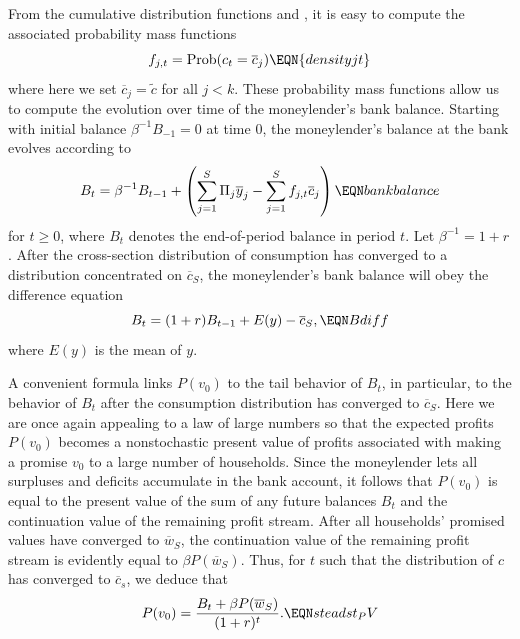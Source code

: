   From the cumulative distribution functions  and
, it is easy to compute the associated probability mass functions
$$ f_{j,t} = {\rm Prob} (c_t = \overline c_j)   \EQN{densityjt} $$
where here we set $\overline c_j = \tilde c$ for all $j < k$.
These probability mass functions allow us to compute the evolution over time
of the moneylender's bank balance.  Starting with initial
balance $\beta^{-1} B_{-1} =0$ at time $0$, the moneylender's balance at
the bank evolves according to
$$ B_{t} = \beta^{-1} B_{t-1}
  + \left(\sum_{j=1}^S \Pi_j \overline y_j - \sum_{j=1}^S
  f_{j,t}  \overline c_j\right) \EQN bankbalance $$
for $t \geq 0$, where $B_t$ denotes the end-of-period balance
in period $t$.  Let $\beta^{-1} = 1+r$.
 After the cross-section distribution
of consumption has converged to a distribution
concentrated on $\overline c_S$, the moneylender's bank
balance will obey the difference equation
$$ B_t = (1+r) B_{t-1} + E(y) - \overline c_S , \EQN Bdiff  $$
where $E(y)$ is the mean of $y$.

A convenient formula links $P(v_0)$ to the tail behavior of $B_t$,
in particular, to the behavior of $B_t$  after the consumption
distribution has converged to $\overline c_S$. Here we are once
again appealing to a law of large numbers so that the expected
profits $P(v_0)$ becomes a nonstochastic present value of profits
associated with making a promise $v_0$ to a large number of
households. Since the moneylender lets all surpluses and deficits
 accumulate in the bank account, it follows that $P(v_0)$
is equal to the present value of the sum of any future balances
$B_t$ and the continuation value of the remaining profit stream.
After
all households' promised values have converged to $\overline
w_S$, the continuation value of the remaining profit stream is evidently
equal to $\beta P(\overline w_S)$.  Thus, for $t$ such that the distribution of $c$ has
converged to $\overline c_s$, we deduce that
$$
P(v_0) = {B_t + \beta P(\overline w_S) \over (1+r)^t }.   \EQN
steadst_PV
$$

